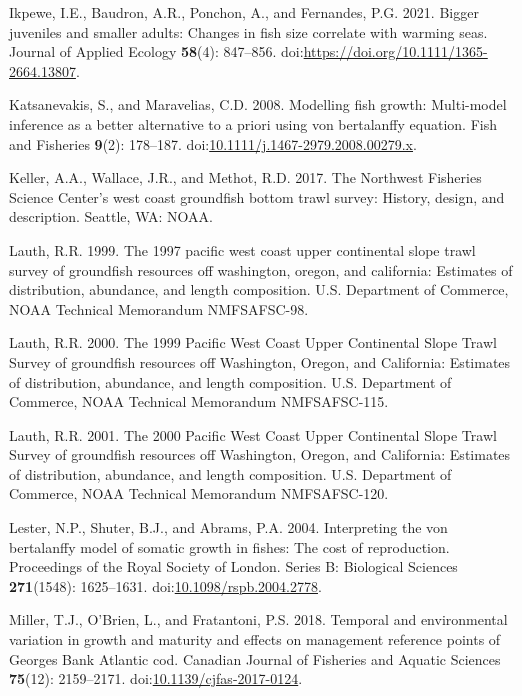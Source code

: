 \documentclass[
]{article}
\newlength{\cslhangindent}
\newlength{\cslentryspacingunit} %
\newenvironment{CSLReferences}[2] %
 {%
  \setlength{\parindent}{0pt}
  \ifodd #1
  \let\oldpar\par
  \def\par{\hangindent=\cslhangindent\oldpar}
  \fi
  \setlength{\parskip}{#2\cslentryspacingunit}
 }%
 {}
\begin{document}
\begin{CSLReferences}{1}{0}
\leavevmode{}%
Ikpewe, I.E., Baudron, A.R., Ponchon, A., and Fernandes, P.G. 2021.
Bigger juveniles and smaller adults: Changes in fish size correlate with
warming seas. Journal of Applied Ecology \textbf{58}(4): 847--856.
doi:\url{https://doi.org/10.1111/1365-2664.13807}.

\leavevmode{}%
Katsanevakis, S., and Maravelias, C.D. 2008. Modelling fish growth:
Multi-model inference as a better alternative to a priori using von
bertalanffy equation. Fish and Fisheries \textbf{9}(2): 178--187.
doi:\href{https://doi.org/10.1111/j.1467-2979.2008.00279.x}{10.1111/j.1467-2979.2008.00279.x}.

\leavevmode{}%
Keller, A.A., Wallace, J.R., and Methot, R.D. 2017. The {Northwest
Fisheries Science Center's} west coast groundfish bottom trawl survey:
History, design, and description. Seattle, WA: NOAA.

\leavevmode{}%
Lauth, R.R. 1999. The 1997 pacific west coast upper continental slope
trawl survey of groundfish resources off washington, oregon, and
california: Estimates of distribution, abundance, and length
composition. {U.S. Department of Commerce, NOAA Technical Memorandum
NMFSAFSC-98}.

\leavevmode{}%
Lauth, R.R. 2000. {The 1999 Pacific West Coast Upper Continental Slope
Trawl Survey of groundfish resources off Washington, Oregon, and
California: Estimates of distribution, abundance, and length
composition}. {U.S. Department of Commerce, NOAA Technical Memorandum
NMFSAFSC-115}.

\leavevmode{}%
Lauth, R.R. 2001. {The 2000 Pacific West Coast Upper Continental Slope
Trawl Survey of groundfish resources off Washington, Oregon, and
California: Estimates of distribution, abundance, and length
composition}. {U.S. Department of Commerce, NOAA Technical Memorandum
NMFSAFSC-120}.

\leavevmode{}%
Lester, N.P., Shuter, B.J., and Abrams, P.A. 2004. Interpreting the von
bertalanffy model of somatic growth in fishes: The cost of reproduction.
Proceedings of the Royal Society of London. Series B: Biological
Sciences \textbf{271}(1548): 1625--1631.
doi:\href{https://doi.org/10.1098/rspb.2004.2778}{10.1098/rspb.2004.2778}.

\leavevmode{}%
Miller, T.J., O'Brien, L., and Fratantoni, P.S. 2018. Temporal and
environmental variation in growth and maturity and effects on management
reference points of {G}eorges {B}ank {A}tlantic cod. Canadian Journal of
Fisheries and Aquatic Sciences \textbf{75}(12): 2159--2171.
doi:\href{https://doi.org/10.1139/cjfas-2017-0124}{10.1139/cjfas-2017-0124}.


\end{CSLReferences}
\end{document}
